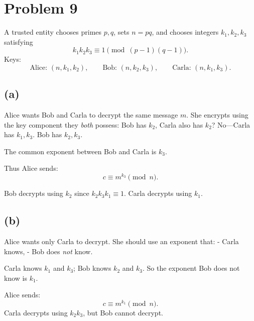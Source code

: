\section*{Problem 9}

A trusted entity chooses primes \(p,q\), sets \(n=pq\), and chooses integers \(k_1,k_2,k_3\)
satisfying
\[
k_1 k_2 k_3 \equiv 1 \pmod{(p-1)(q-1)}.
\]
Keys:
\[
\text{Alice: }(n,k_1,k_2),\qquad
\text{Bob: }(n,k_2,k_3),\qquad
\text{Carla: }(n,k_1,k_3).
\]

\subsection*{(a)}
Alice wants Bob and Carla to decrypt the same message \(m\).
She encrypts using the key component they \emph{both} possess:
Bob has \(k_2\), Carla also has \(k_2\)?
No—Carla has \(k_1,k_3\).  
Bob has \(k_2,k_3\).

The common exponent between Bob and Carla is \(k_3\).

Thus Alice sends:
\[
c \equiv m^{k_3} \pmod{n}.
\]

Bob decrypts using \(k_2\) since \(k_2 k_3 k_1 \equiv 1\).  
Carla decrypts using \(k_1\).

\subsection*{(b)}
Alice wants only Carla to decrypt. She should use an exponent that:
- Carla knows,
- Bob does \emph{not} know.

Carla knows \(k_1\) and \(k_3\); Bob knows \(k_2\) and \(k_3\).  
So the exponent Bob does not know is \(k_1\).

Alice sends:
\[
c \equiv m^{k_1} \pmod{n}.
\]
Carla decrypts using \(k_2 k_3\), but Bob cannot decrypt.

